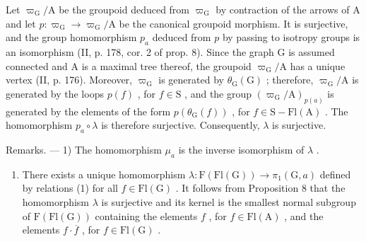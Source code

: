 Let \(\varpi_{\mathrm{G}} / \mathrm{A}\) be the groupoid deduced from \(\varpi_{\mathrm{G}}\) by contraction of the arrows of A and let \(p\colon \varpi_{\mathrm{G}}\to \varpi_{\mathrm{G}} / \mathrm{A}\) be the canonical groupoid morphism. It is surjective, and the group homomorphism \(p_a\) deduced from \(p\) by passing to isotropy groups is an isomorphism (II, p. 178, cor. 2 of prop. 8). Since the graph G is assumed connected and A is a maximal tree thereof, the groupoid \(\varpi_{\mathrm{G}} / \mathrm{A}\) has a unique vertex (II, p. 176). Moreover, \(\varpi_{\mathrm{G}}\) is generated by \(\theta_{\mathrm{G}}(\mathrm{G})\) ; therefore, \(\varpi_{\mathrm{G}} / \mathrm{A}\) is generated by the loops \(p(f)\) , for \(f\in \mathrm{S}\) , and the group \((\varpi_{\mathrm{G}} / \mathrm{A})_{p(a)}\) is generated by the elements of the form \(p(\theta_{\mathrm{G}}(f))\) , for \(f\in \mathrm{S} - \mathrm{Fl}(\mathrm{A})\) . The homomorphism \(p_a\circ \lambda\) is therefore surjective. Consequently, \(\lambda\) is surjective.

Remarks. --- 1) The homomorphism \(\mu_{a}\) is the inverse isomorphism of \(\lambda\) .

\begin{enumerate}
\def\labelenumi{\arabic{enumi})}
\setcounter{enumi}{1}
\tightlist
\item
  There exists a unique homomorphism \(\lambda\colon\mathrm{F}(\mathrm{Fl}(\mathrm{G}))\to\pi_{1}(\mathrm{G},a)\) defined by relations (1) for all \(f\in\mathrm{Fl}(\mathrm{G})\) . It follows from Proposition 8 that the homomorphism \(\lambda\) is surjective and its kernel is the smallest normal subgroup of \(\mathrm{F}(\mathrm{Fl}(\mathrm{G}))\) containing the elements \(f\) , for \(f\in\mathrm{Fl}(\mathrm{A})\) , and the elements \(f\cdot\overline{f}\) , for \(f\in\mathrm{Fl}(\mathrm{G})\) .
\end{enumerate}

